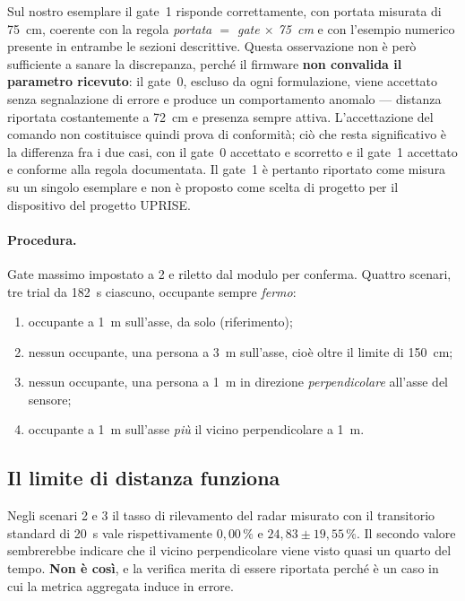 Sul nostro esemplare il gate~1 risponde correttamente, con portata misurata di
75~cm, coerente con la regola \emph{portata $=$ gate $\times$ 75~cm} e con
l'esempio numerico presente in entrambe le sezioni descrittive. Questa osservazione
non è però sufficiente a sanare la discrepanza, perché il firmware
\textbf{non convalida il parametro ricevuto}: il gate~0, escluso da ogni
formulazione, viene accettato senza segnalazione di errore e produce un
comportamento anomalo --- distanza riportata costantemente a 72~cm e presenza
sempre attiva. L'accettazione del comando non costituisce quindi prova di
conformità; ciò che resta significativo è la differenza fra i due casi, con il
gate~0 accettato e scorretto e il gate~1 accettato e conforme alla regola
documentata. Il gate~1 è pertanto riportato come misura su un singolo esemplare e
non è proposto come scelta di progetto per il dispositivo del progetto UPRISE.

\paragraph{Procedura.} Gate massimo impostato a 2 e riletto dal modulo per conferma.
Quattro scenari, tre trial da 182~s ciascuno, occupante sempre \emph{fermo}:

\begin{enumerate}[leftmargin=1.8em,itemsep=2pt]
  \item occupante a 1~m sull'asse, da solo (riferimento);
  \item nessun occupante, una persona a 3~m sull'asse, cioè oltre il limite di 150~cm;
  \item nessun occupante, una persona a 1~m in direzione \emph{perpendicolare}
        all'asse del sensore;
  \item occupante a 1~m sull'asse \emph{più} il vicino perpendicolare a 1~m.
\end{enumerate}

\subsection{Il limite di distanza funziona}

Negli scenari 2 e 3 il tasso di rilevamento del radar misurato con il transitorio
standard di 20~s vale rispettivamente $0{,}00\,\%$ e $24{,}83 \pm 19{,}55\,\%$. Il
secondo valore sembrerebbe indicare che il vicino perpendicolare viene visto quasi un
quarto del tempo. \textbf{Non è così}, e la verifica merita di essere riportata perché
è un caso in cui la metrica aggregata induce in errore.

